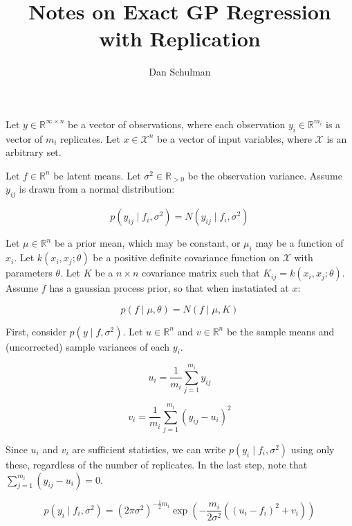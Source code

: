 \documentclass{article}
\title{Notes on Exact GP Regression with Replication}
\author{Dan Schulman}
\newcommand{\real}{\mathbb{R}}
\begin{document}
\maketitle

Let $y \in \real^{\infty \times n}$ be a vector of observations, where each observation $y_i \in \real^{m_i}$ is a vector of $m_i$ replicates.
Let $x \in \mathcal{X}^n$ be a vector of input variables, where $\mathcal{X}$ is an arbitrary set.

Let $f \in \real^n$ be latent means.
Let $\sigma^2 \in \real_{>0}$ be the observation variance.
Assume $y_{ij}$ is drawn from a normal distribution:

\begin{equation}
    p(y_{ij} \mid f_i, \sigma^2) = N(y_{ij} \mid f_i, \sigma^2)
\end{equation}

Let $\mu \in \real^n$ be a prior mean, which may be constant, or $\mu_i$ may be a function of $x_i$.
Let $k(x_i, x_j; \theta)$ be a positive definite covariance function on $\mathcal{X}$ with parameters $\theta$.
Let $K$ be a $n \times n$ covariance matrix such that $K_{ij} = k(x_i, x_j; \theta)$.
Assume $f$ has a gaussian process prior, so that when instatiated at $x$:

\begin{equation}
    p(f \mid \mu, \theta) = N(f \mid \mu, K)
\end{equation}

First, consider $p(y \mid f, \sigma^2)$.
Let $u \in \real^n$ and $v \in \real^n$ be the sample means and (uncorrected) sample variances of each $y_i$.

\begin{equation}
    u_i = \frac{1}{m_i} \sum_{j=1}^{m_i} y_{ij}
\end{equation}

\begin{equation}
    v_i = \frac{1}{m_i} \sum_{j=1}^{m_i} (y_{ij} - u_i)^2
\end{equation}

Since $u_i$ and $v_i$ are sufficient statistics, we can write $p(y_i \mid f_i, \sigma^2)$ using only these, regardless of the number of replicates.
In the last step, note that $\sum_{j=1}^{m_i} (y_{ij} - u_i) = 0$.

\begin{equation}
    p(y_i \mid f_i, \sigma^2)
    =
    (2 \pi \sigma^2)^{-\frac{1}{2} m_i} 
    \exp\left(
        -\frac{m_i}{2\sigma^2} \left(
            (u_i - f_i)^2 + v_i
        \right)
    \right)
\end{equation}
\end{document}
